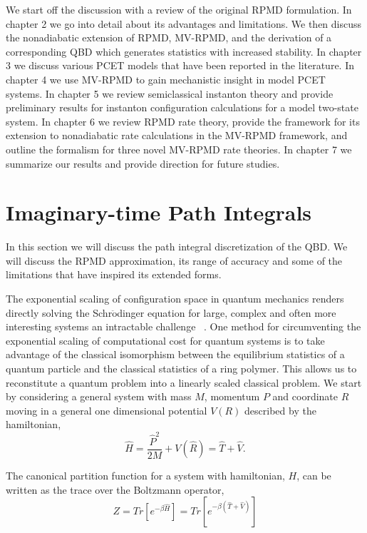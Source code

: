 \documentclass[phd,tocprelim]{cornell}
\begin{document}
We start off the discussion with a review of the original RPMD formulation. In chapter 2 we go into detail about its advantages and limitations. We then discuss the nonadiabatic extension of RPMD, MV-RPMD,  and the derivation of a corresponding QBD which generates statistics with increased stability. In chapter 3 we discuss various PCET models that have been reported in the literature. In chapter 4 we use MV-RPMD to gain mechanistic insight in model PCET systems. In chapter 5 we review semiclassical instanton theory and provide preliminary results for instanton configuration calculations for a model two-state system. In chapter 6 we review RPMD rate theory, provide the framework for its extension to nonadiabatic rate calculations in the MV-RPMD framework, and outline the formalism for three novel MV-RPMD rate theories.  In chapter 7 we summarize our results and provide direction for future studies. 

\chapter{Imaginary-time Path Integrals}


In this section we will discuss the path integral discretization of the QBD. We will discuss the RPMD approximation, its range of accuracy and some of the limitations that have inspired its extended forms. 


The exponential scaling of configuration space in quantum mechanics renders directly solving the Schr$\ddot{\textrm{o}}$dinger equation for large, complex and often more interesting systems an intractable challenge ~\cite{MAKRI1994, MAKRI1995}. One method for circumventing the exponential scaling of computational cost for quantum systems is to take advantage of the classical isomorphism between the equilibrium statistics of a quantum particle and the classical statistics of a ring polymer. This allows us to reconstitute a quantum problem into a linearly scaled classical problem. We start by
considering a general system with mass $M$,  momentum $P$ and coordinate $R$ moving in a general one dimensional potential $V(R)$ described by the hamiltonian,
\begin{equation}
\hat{H} = \frac{\hat{P}^2}{2M} + V(\hat{R}) = \hat{T} +\hat{V}.
\end{equation}

The canonical partition function for a system with hamiltonian, $H$, can be written as the trace over the Boltzmann operator,
\begin{equation}
Z= Tr[e^{-\beta \hat{H}}] =  Tr[e^{-\beta (\hat{T} + \hat{V})}]
\end{equation}
\end{document}
